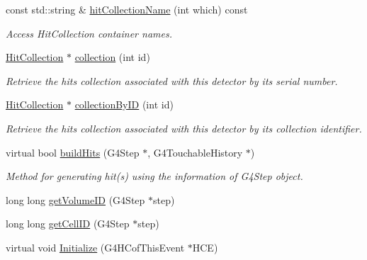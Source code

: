 \begin{DoxyCompactItemize}
const std::string \& \hyperlink{class_d_d4hep_1_1_simulation_1_1_geant4_sensitive_detector_ad8477ffc5ca65a24cb8270784177762d}{hitCollectionName} (int which) const 
\begin{DoxyCompactList}\small\item\em Access HitCollection container names. \item\end{DoxyCompactList}\item 
\hyperlink{class_d_d4hep_1_1_geometry_1_1_hit_collection}{HitCollection} $\ast$ \hyperlink{class_d_d4hep_1_1_simulation_1_1_geant4_sensitive_detector_a29e835271c9efa731bba49c64790281b}{collection} (int id)
\begin{DoxyCompactList}\small\item\em Retrieve the hits collection associated with this detector by its serial number. \item\end{DoxyCompactList}\item 
\hyperlink{class_d_d4hep_1_1_geometry_1_1_hit_collection}{HitCollection} $\ast$ \hyperlink{class_d_d4hep_1_1_simulation_1_1_geant4_sensitive_detector_a45d013173dd5a1b159e2bb2bfca12d56}{collectionByID} (int id)
\begin{DoxyCompactList}\small\item\em Retrieve the hits collection associated with this detector by its collection identifier. \item\end{DoxyCompactList}\item 
virtual bool \hyperlink{class_d_d4hep_1_1_simulation_1_1_geant4_sensitive_detector_a96d4594c8e1af23ef5c572938460670e}{buildHits} (G4Step $\ast$, G4TouchableHistory $\ast$)
\begin{DoxyCompactList}\small\item\em Method for generating hit(s) using the information of G4Step object. \item\end{DoxyCompactList}\item 
long long \hyperlink{class_d_d4hep_1_1_simulation_1_1_geant4_sensitive_detector_adb27c3e691e051044fbf1bd06cd70cac}{getVolumeID} (G4Step $\ast$step)
\item 
long long \hyperlink{class_d_d4hep_1_1_simulation_1_1_geant4_sensitive_detector_a02a92ee533ee2067bc629f7a8b123c89}{getCellID} (G4Step $\ast$step)
\item 
virtual void \hyperlink{class_d_d4hep_1_1_simulation_1_1_geant4_sensitive_detector_a7ee158e29937473f04db1cc6c7284923}{Initialize} (G4HCofThisEvent $\ast$HCE)

\end{DoxyCompactItemize}
